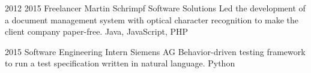 {\block%
{%
2012 %
}{%
2015%
}{%
Freelancer
}{%
Martin Schrimpf Software Solutions
}{%
Led the development of a document %
management system with optical character recognition to make the client company paper-free.
}{%
Java, JavaScript, PHP
}

\block%
{%
2015%
}{%
}{%
Software Engineering Intern
}{%
Siemens AG
}{%
Behavior-driven testing framework to run a test specification written in natural language.%
}{%
Python
}

}


\newcommand{\publications}{%

\publication{2018}{bashivan2018continual}

\publication{2018}{arend2018single}

\publication{2018}{kubilius2018}

\publication{2018}{schrimpf2018b}

\publication{2018}{schrimpf2018}

\publication{2018}{TangSchrimpfLotter2018}

\publication{2017}{cheney2017robustness}

\publication{2016}{schrimpf2016}

}


